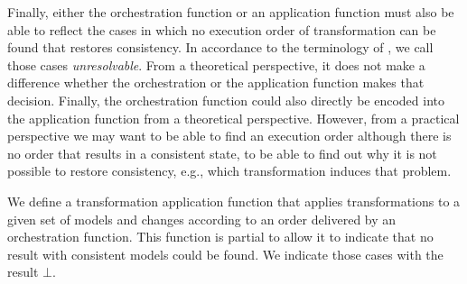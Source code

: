 Finally, either the orchestration function or an application function must also be able to reflect the cases in which no execution order of transformation can be found that restores consistency.
In accordance to the terminology of \textcite{stevens2020BidirectionalTransformationLarge-SoSym}, we call those cases \emph{unresolvable}.
From a theoretical perspective, it does not make a difference whether the orchestration or the application function makes that decision. 
Finally, the orchestration function could also directly be encoded into the application function from a theoretical perspective.
However, from a practical perspective we may want to be able to find an execution order although there is no order that results in a consistent state, to be able to find out why it is not possible to restore consistency, e.g., which transformation induces that problem.

We define a transformation \gls{application function} that applies transformations to a given set of models and changes according to an order delivered by an \gls{orchestration function}.
This function is partial to allow it to indicate that no result with consistent models could be found.
We indicate those cases with the result $\bot$.

